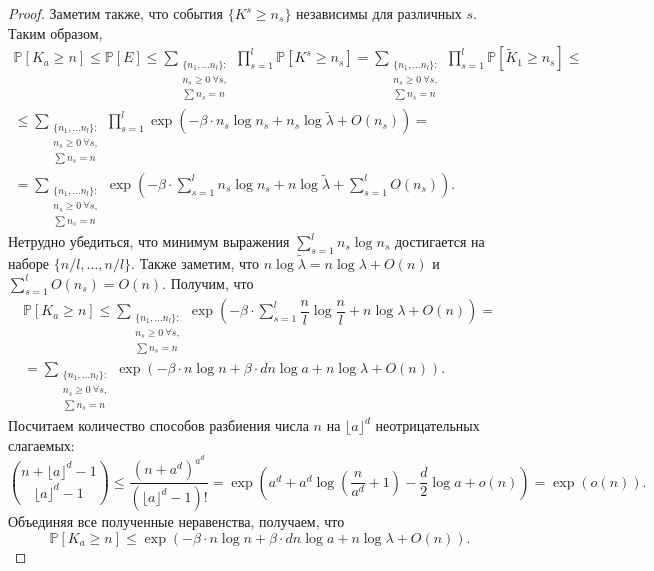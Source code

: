 \documentclass[12pt]{article}
\theoremstyle{plain}
\theoremstyle{definition}
\theoremstyle{remark}
\def\geq{\geqslant}
\def\leq{\leqslant}
\newcommand{\PP}{\mathbb{P}}
\newcommand{\til}{\widetilde}
\begin{document}
\begin{proof}
Заметим также, что события $\{K^s \geq n_s\}$ независимы для различных $s$.\\
Таким образом,
\begin{multline*}
    \PP[K_a\geq n] \leq
    \PP[E] \leq 
    \sum_{\substack{\{n_1, \ldots n_l\}\colon\\ n_s \geq 0\ \forall s,\\ \sum n_s = n}}\prod_{s=1}^l\PP[K^s\geq n_s] =
    \sum_{\substack{\{n_1, \ldots n_l\}\colon\\ n_s \geq 0\ \forall s,\\ \sum n_s = n}}\prod_{s=1}^l\PP[\til K_1\geq n_s]\leq \\
    \leq \sum_{\substack{\{n_1, \ldots n_l\}\colon\\ n_s \geq 0\ \forall s,\\ \sum n_s = n}}\prod_{s=1}^l \exp(-\beta\cdot n_s\log n_s + n_s\log\til\lambda + O(n_s)) =\\
    =\sum_{\substack{\{n_1, \ldots n_l\}\colon\\ n_s \geq 0\ \forall s,\\ \sum n_s = n}}\exp\left(-\beta\cdot \sum_{s=1}^l n_s\log n_s + n\log\til\lambda + \sum_{s=1}^l O(n_s)\right).
    \end{multline*}
Нетрудно убедиться, что минимум выражения $\sum_{s=1}^l n_s\log n_s$ достигается на наборе $\{n/l, \ldots, n/l\}$. Также заметим, что $n\log\til\lambda = n\log\lambda + O(n)$ и $\sum_{s=1}^lO(n_s) = O(n)$. Получим, что
    \begin{multline*}
    \PP[K_a\geq n]\leq
    \sum_{\substack{\{n_1, \ldots n_l\}\colon\\ n_s \geq 0\ \forall s,\\ \sum n_s = n}}\exp\left(-\beta\cdot \sum_{s=1}^l \dfrac{n}{l}\log\dfrac{n}{l} + n\log\lambda + O(n)\right) = \\
    =\sum_{\substack{\{n_1, \ldots n_l\}\colon\\ n_s \geq 0\ \forall s,\\ \sum n_s = n}}\exp\left(-\beta\cdot n\log n + \beta\cdot dn\log a + n\log\lambda + O(n)\right).
    \end{multline*}
Посчитаем количество способов разбиения числа $n$ на $\lfloor a\rfloor^d$ неотрицательных слагаемых:
\begin{equation*}
    \binom{n + \lfloor a\rfloor^d - 1}{\lfloor a\rfloor^d - 1} \leq \dfrac{(n + a^d)^{a^d}}{(\lfloor a\rfloor^d -1)!} = \exp\left(a^d + a^d\log\left(\dfrac{n}{a^d}+1\right) - \dfrac{d}{2} \log a + o(n)\right) = \exp(o(n)).
\end{equation*}{}
Объединяя все полученные неравенства, получаем, что 
\begin{equation*}
    \PP[K_a\geq n]\leq
    \exp\left(-\beta\cdot n\log n + \beta\cdot dn\log a + n\log\lambda + O(n) \right).
\end{equation*}{}
\end{proof}{}
\end{document}
